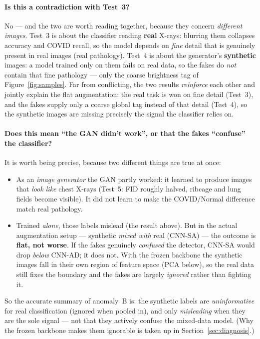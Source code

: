 \documentclass[11pt]{article}
\begin{document}
\paragraph{Is this a contradiction with Test~3?} No --- and the two are worth reading
together, because they concern \emph{different images}. Test~3 is about the classifier
reading \textbf{real} X-rays: blurring them collapses accuracy and COVID recall, so
the model depends on \emph{fine} detail that is genuinely present in real images
(real pathology). Test~4 is about the generator's \textbf{synthetic} images: a model
trained only on them fails on real data, so the fakes do \emph{not} contain that fine
pathology --- only the coarse brightness tag of Figure~\ref{fig:samples}. Far from
conflicting, the two results \emph{reinforce} each other and jointly explain the flat
augmentation: the real task is won on fine detail (Test~3), and the fakes supply only
a coarse global tag instead of that detail (Test~4), so the synthetic images are
missing precisely the signal the classifier relies on.

\paragraph{Does this mean ``the GAN didn't work'', or that the fakes ``confuse''
the classifier?} It is worth being precise, because two different things are true
at once:
\begin{itemize}[nosep,leftmargin=1.4em]
  \item As an \emph{image generator} the GAN partly worked: it learned to produce
        images that \emph{look like} chest X-rays (Test~5: FID roughly halved,
        ribcage and lung fields become visible). It did not learn to make the
        COVID/Normal difference match real pathology.
  \item Trained \emph{alone}, those labels mislead (the result above). But in the
        actual augmentation setup --- synthetic \emph{mixed with} real (CNN-SA) ---
        the outcome is \textbf{flat, not worse}. If the fakes genuinely
        \emph{confused} the detector, CNN-SA would drop \emph{below} CNN-AD; it does
        not. With the frozen backbone the synthetic images fall in their own region
        of feature space (PCA below), so the real data still fixes the boundary and
        the fakes are largely \emph{ignored} rather than fighting it.
\end{itemize}
So the accurate summary of anomaly~B is: the synthetic labels are
\emph{uninformative} for real classification (ignored when pooled in), and only
\emph{misleading} when they are the sole signal --- not that they actively confuse
the mixed-data model. (Why the frozen backbone makes them ignorable is taken up in
Section~\ref{sec:diagnosis}.)
\end{document}
